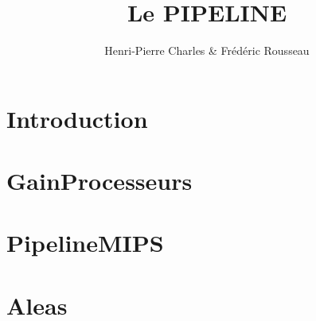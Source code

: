 \documentclass{beamer}
\title{Le PIPELINE}
\author{Henri-Pierre Charles \& Frédéric Rousseau}
\date{}
\newcommand{\Slide}[1]{}
\begin{document}
\begin{frame}
\titlepage
\end{frame}




\section{Introduction}
\Slide{Introduction/SlideIntro}
\Slide{Introduction/Principe}
\Slide{Introduction/AnalogieSansPipeline}
\Slide{Introduction/AnalogieAvecPipeline}
\Slide{Introduction/PerfLaverie}

\section{GainProcesseurs}
\Slide{GainProcesseurs/Interet1}
\Slide{GainProcesseurs/interet2}
\Slide{GainProcesseurs/interet3}

\section{PipelineMIPS}
\Slide{PipelineMIPS/ArchiMIPS1}
\Slide{PipelineMIPS/ArchiMIPS2}
\Slide{PipelineMIPS/ArchiMIPS3}
\Slide{PipelineMIPS/ArchiMIPS4}
\Slide{PipelineMIPS/ArchiMIPS5}

\section{Aleas}
\Slide{Aleas/PrincipeAleas}
\Slide{Aleas/ListeAleas}
\Slide{Aleas/AleasDonnees1}
\Slide{Aleas/AleasDonnees2}
\Slide{Aleas/AleasDonnees3}
\Slide{Aleas/AleasDonnees4}
\Slide{Aleas/AleasDonnees5}
\Slide{Aleas/AleasBranch1}
\Slide{Aleas/AleasBranch2}
\Slide{Aleas/AleasBranch3}
\Slide{Aleas/AleasITExc1}

\Slide{Conclusion/Conclusion}
\Slide{Conclusion/ExerciceTD}
\end{document}
